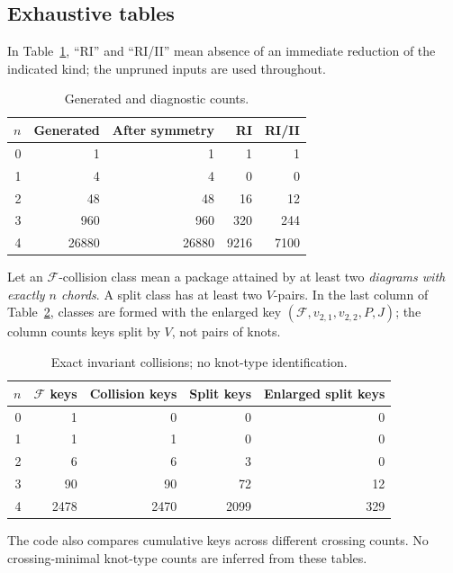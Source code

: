 \documentclass[12pt]{amsart}
\theoremstyle{definition}
\theoremstyle{remark}
\numberwithin{equation}{section}
\newcommand{\Package}{\mathcal F}
\begin{document}
\subsection{Exhaustive tables}
In Table~\ref{en:counts}, ``RI'' and ``RI/II'' mean absence of an immediate
reduction of the indicated kind; the unpruned inputs are used throughout.
\begin{table}[ht]
\centering\small
\caption{Generated and diagnostic counts.}\label{en:counts}
\begin{tabular}{r r r r r}\toprule
$n$&Generated&After symmetry&RI&RI/II\\\midrule
0&1&1&1&1\\
1&4&4&0&0\\
2&48&48&16&12\\
3&960&960&320&244\\
4&26880&26880&9216&7100\\\bottomrule
\end{tabular}
\end{table}

Let an $\Package$-collision class mean a package attained by at least two
\emph{diagrams with exactly $n$ chords}. A split class has at least two
$V$-pairs. In the last column of Table~\ref{en:collisions}, classes are
formed with the enlarged key $(\Package,v_{2,1},v_{2,2},P,J)$; the column
counts keys split by $V$, not pairs of knots.
\begin{table}[ht]
\centering\small
\caption{Exact invariant collisions; no knot-type identification.}\label{en:collisions}
\begin{tabular}{r r r r r}\toprule
$n$&$\Package$ keys&Collision keys&Split keys&Enlarged split keys\\\midrule
0&1&0&0&0\\
1&1&1&0&0\\
2&6&6&3&0\\
3&90&90&72&12\\
4&2478&2470&2099&329\\\bottomrule
\end{tabular}
\end{table}
The code also compares cumulative keys across different crossing counts.
No crossing-minimal knot-type counts are inferred from these tables.
\end{document}
